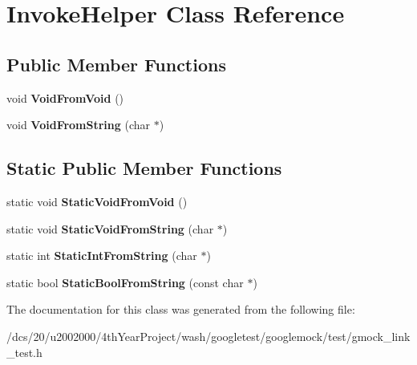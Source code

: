 \hypertarget{classInvokeHelper}{}\section{Invoke\+Helper Class Reference}
\label{classInvokeHelper}
\subsection*{Public Member Functions}
\begin{DoxyCompactItemize}
\item 
\mbox{\label{classInvokeHelper_a6371bcb64a8f01093f6fdef60776a031}} 
void {\bfseries Void\+From\+Void} ()
\item 
\mbox{\label{classInvokeHelper_a89f02dc384e6b5a7d935b7ea0a81cc9e}} 
void {\bfseries Void\+From\+String} (char $\ast$)
\end{DoxyCompactItemize}
\subsection*{Static Public Member Functions}
\begin{DoxyCompactItemize}
\item 
\mbox{\label{classInvokeHelper_ae96b5bd7c4fa328d0a87bc986f135fe8}} 
static void {\bfseries Static\+Void\+From\+Void} ()
\item 
\mbox{\label{classInvokeHelper_a5e95ce4214e89b180da9953d94396536}} 
static void {\bfseries Static\+Void\+From\+String} (char $\ast$)
\item 
\mbox{\label{classInvokeHelper_a5cfb11cca70ec5a9f59e8b7a4d4c2f85}} 
static int {\bfseries Static\+Int\+From\+String} (char $\ast$)
\item 
\mbox{\label{classInvokeHelper_aef16e38107cd8ddc0a52d7d0ab153211}} 
static bool {\bfseries Static\+Bool\+From\+String} (const char $\ast$)
\end{DoxyCompactItemize}


The documentation for this class was generated from the following file\+:\begin{DoxyCompactItemize}
\item 
/dcs/20/u2002000/4th\+Year\+Project/wash/googletest/googlemock/test/gmock\+\_\+link\+\_\+test.\+h\end{DoxyCompactItemize}
